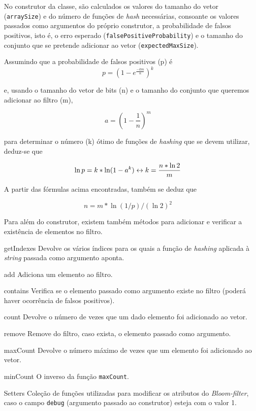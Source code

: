 \documentclass[a4paper,11pt,openright,oneside]{report}
\begin{document}
No construtor da classe, são calculados os valores do tamanho do vetor (\texttt{arraySize}) e do número de funções de \textit{hash} necessárias, consoante os valores passados como argumentos do próprio construtor, a probabilidade de falsos positivos, isto é, o erro esperado (\texttt{falsePositiveProbability}) e o tamanho do conjunto que se pretende adicionar ao vetor (\texttt{expectedMaxSize}). 

Assumindo que a probabilidade de falsos positivos (p) é
$$ p =  (1 - e^\frac{-km}{n})^k $$

e, usando o tamanho do vetor de bits (n) e o tamanho do conjunto que queremos adicionar ao filtro (m),

$$ a = (1 - \frac{1}{n})^m $$

para determinar o número (k) ótimo de funções de \textit{hashing} que se devem utilizar, deduz-se que

$$ \ln p = k * \ln (1 - a^k) \\
\leftrightarrow k =  \frac{n * \ln 2}{m}$$

A partir das fórmulas acima encontradas, também se deduz que

$$ n = m * \ln (1 / p) / (\ln 2) ^ 2  $$

Para além do construtor, existem também métodos para adicionar e verificar a existência de elementos no filtro.

\item[getIndexes]
Devolve os vários índices para os quais a função de \textit{hashing} aplicada à \textit{string} passada como argumento aponta.
\item[add]
Adiciona um elemento ao filtro.
\item[contains]
Verifica se o elemento passado como argumento existe no filtro (poderá haver ocorrência de falsos positivos).
\item[count]
Devolve o número de vezes que um dado elemento foi adicionado ao vetor.
\item[remove]
Remove do filtro, caso exista, o elemento passado como argumento.
\item[maxCount]
Devolve o número máximo de vezes que um elemento foi adicionado ao vetor.
\item[minCount]
O inverso da função \texttt{maxCount}.
\item[Setters]
Coleção de funções utilizadas para modificar os atributos do \textit{Bloom-filter}, caso o campo \texttt{debug} (argumento passado ao construtor) esteja com o valor 1.
\end{document}
